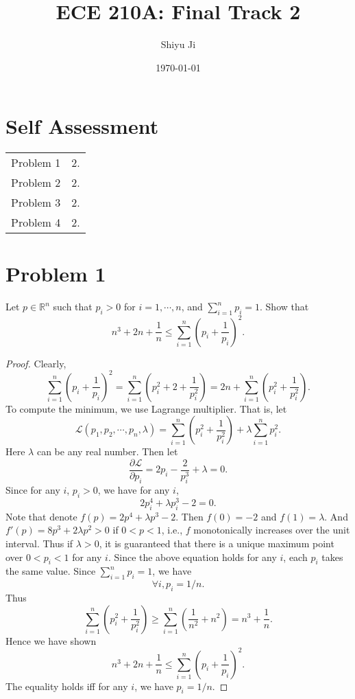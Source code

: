 \documentclass[12pt]{article}
\theoremstyle{plain}
\begin{document}
\title{ECE 210A: Final Track 2}
\author{Shiyu Ji}
\date{\today}
\maketitle

\newcommand{\m}[1]{\begin{pmatrix}#1\end{pmatrix}}
\newcommand{\rank}[1]{\operatorname{rank}(#1)}

\section{Self Assessment}

\begin{tabular}{c|c}
Problem 1 & 2.\\
Problem 2 & 2.\\
Problem 3 & 2.\\
Problem 4 & 2.\\
\end{tabular}

\section{Problem 1}
Let $p\in\mathbb{R}^n$ such that $p_i > 0$ for $i=1,\cdots,n$, and $\sum_{i=1}^n p_i = 1$. Show that
$$n^3 + 2n + \frac{1}{n} \leq \sum_{i=1}^n \left(p_i + \frac{1}{p_i} \right)^2.$$

\begin{proof}
Clearly,
$$\sum_{i=1}^n \left(p_i + \frac{1}{p_i} \right)^2 = \sum_{i=1}^n \left( p_i^2 + 2 + \frac{1}{p_i^2} \right) = 2n + \sum_{i=1}^n \left(p_i^2+\frac{1}{p_i^2}\right).$$
To compute the minimum, we use Lagrange multiplier. That is, let
$$\mathcal{L}(p_1,p_2,\cdots,p_n, \lambda) = \sum_{i=1}^n \left(p_i^2+\frac{1}{p_i^2}\right) + \lambda \sum_{i=1}^n p_i^2.$$
Here $\lambda$ can be any real number. 
Then let
$$\frac{\partial \mathcal{L}}{\partial p_i} = 2p_i - \frac{2}{p_i^3} + \lambda =0.$$
Since for any $i$, $p_i>0$, we have for any $i$,
$$2p_i^4 + \lambda p_i^3 -2 = 0.$$
Note that denote $f(p) = 2p^4 + \lambda p^3 - 2$. Then $f(0) = -2$ and $f(1) = \lambda$. And $f'(p) = 8p^3 + 2\lambda p^2 > 0$ if $0<p<1$, i.e., $f$ monotonically increases over the unit interval. Thus if $\lambda > 0$, it is guaranteed that there is a unique maximum point over $0<p_i<1$ for any $i$. Since the above equation holds for any $i$, each $p_i$ takes the same value. Since $\sum_{i=1}^n p_i = 1$, we have 
$$\forall i, p_i = 1/n.$$
Thus
$$\sum_{i=1}^n \left(p_i^2+\frac{1}{p_i^2}\right) \geq \sum_{i=1}^n \left( \frac{1}{n^2} + n^2\right) = n^3 + \frac{1}{n}.$$
Hence we have shown
$$n^3 + 2n + \frac{1}{n} \leq \sum_{i=1}^n \left(p_i + \frac{1}{p_i} \right)^2.$$
The equality holds iff for any $i$, we have $p_i=1/n$.
\end{proof}
\end{document}
